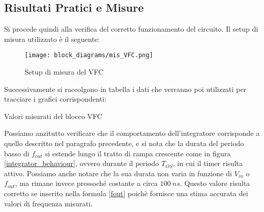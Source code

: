 
\subsection*{Risultati Pratici e Misure}


Si procede quindi alla verifica del corretto funzionamento del circuito. Il setup di
misura utilizzato è il seguente:

\begin{figure}[H]
    \centering
    \texttt{[image: block\_diagrams/mis\_VFC.png]}
    \caption{Setup di misura del VFC}
    \label{mis_VFC}
\end{figure}

Successivamente si raccolgono in tabella i dati che verranno poi utilizzati per tracciare i
grafici corrispondenti:

\begin{table}[H]
    \centering
    \caption{Valori misurati del blocco VFC}
    \label{vfc_table}
\end{table}

Possiamo anzitutto verificare che il comportamento dell'integratore corrisponde a quello
descritto nel paragrafo precedente, e si nota che la durata del periodo basso di $f_{out}$
si estende lungo il tratto di rampa crescente come in figura \ref{integrator_behaviour},
ovvero durante il periodo $T_{OS}$, in cui il timer risulta attivo. Possiamo anche
notare che la sua durata non varia in funzione di $V_{in}$ o $f_{out}$, ma rimane invece
pressoché costante a circa $100\ ns$. Questo valore risulta corretto se inserito nella
formula \ref{fout} poichè fornisce una stima accurata dei valori di frequenza misurati.

